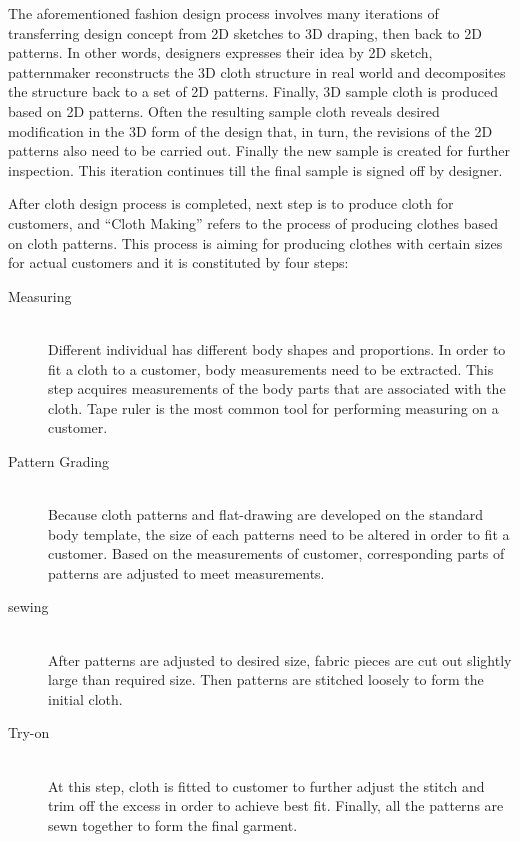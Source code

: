 The aforementioned fashion design process involves many iterations of transferring design concept from 2D sketches to 3D draping, then back to 2D patterns. In other words, designers expresses their idea by 2D sketch, patternmaker reconstructs the 3D cloth structure in real world and decomposites the structure back to a set of 2D patterns. Finally, 3D sample cloth is produced based on 2D patterns. Often the resulting sample cloth reveals desired modification in the 3D form of the design that, in turn, the revisions of the 2D patterns also need to be carried out. Finally the new sample is created for further inspection. This iteration continues till the final sample is signed off by designer.

After cloth design process is completed, next step is to produce cloth for customers, and ``Cloth Making'' refers to the process of producing clothes based on cloth patterns. This process is aiming for producing clothes with certain sizes for actual customers and it is constituted by four steps: 

\begin{description}
\item[Measuring] \hfill \\
Different individual has different body shapes and proportions. In order to fit a cloth to a customer, body measurements need to be extracted. This step acquires measurements of the body parts that are associated with the cloth. Tape ruler is the most common tool for performing measuring on a customer. 
\item[Pattern Grading] \hfill \\
Because cloth patterns and flat-drawing are developed on the standard body template, the size of each patterns need to be altered in order to fit a customer. Based on the measurements of customer, corresponding parts of patterns are adjusted to meet measurements. 
\item[sewing] \hfill \\
After patterns are adjusted to desired size, fabric pieces are cut out slightly large than required size. Then patterns are stitched loosely to form the initial cloth. 
\item[Try-on] \hfill \\
At this step, cloth is fitted to customer to further adjust the stitch and trim off the excess in order to achieve best fit. Finally, all the patterns are sewn together to form the final garment.
\end{description}

